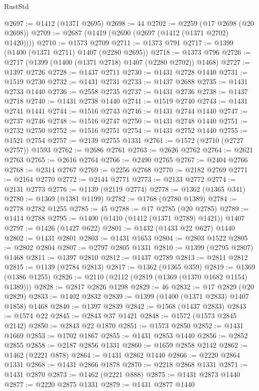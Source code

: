 \begin{lexlean}{RustStd}
\begin{coremodule}
@2697 := @1412 (@1371 @2695)
@2698 := 44
@2702 := @2259 (@17 @2698 (@20 @2698))
@2709 := @2687 (@1419 (@2690 (@2697 (@1412 (@1371 @2702) @1420))))
@2710 := @1573 @2709
@2711 := @1373 @791
@2717 := @1399 (@1400 (@1371 @2711) @1407 (@2280 @2695))
@2718 := @1373 @796
@2726 := @2717 (@1399 (@1400 (@1371 @2718) @1407 (@2280 @2702)) @1468)
@2727 := @1397 @2726
@2728 := @1437 @2711
@2730 := @1431 @2728 @1440
@2731 := @1519 @2730
@2732 := @1431 @2731
@2733 := @1437 @2688
@2735 := @1431 @2733 @1440
@2736 := @2558 @2735
@2737 := @1431 @2736
@2738 := @1437 @2718
@2740 := @1431 @2738 @1440
@2741 := @1519 @2740
@2743 := @1431 @2741 @1441
@2744 := @1516 @2743
@2746 := @1431 @2744 @1440
@2747 := @2737 @2746
@2748 := @1516 @2747
@2750 := @1431 @2748 @1440
@2751 := @2732 @2750
@2752 := @1516 @2751
@2754 := @1431 @2752 @1440
@2755 := @1521 @2754
@2757 := @2139 @2755 @1331
@2761 := @1572 (@2710 (@2727 @2757)) @1593
@2762 := @2686 @2761
@2763 := @2626 @2762
@2764 := @2621 @2763
@2765 := @2616 @2764
@2766 := @2490 @2765
@2767 := @2404 @2766
@2768 := @2314 @2767
@2769 := @2256 @2768
@2770 := @2182 @2769
@2771 := @2164 @2770
@2772 := @2144 @2771
@2773 := @2133 @2772
@2774 := @2131 @2773
@2776 := @1139 (@2119 @2774)
@2778 := @1362 (@1365 @341)
@2780 := @1369 (@1381 @1199)
@2782 := @1768 (@2780 @1389)
@2784 := @2778 @2782 @1255
@2785 := 45
@2788 := @17 @2785 (@20 @2785)
@2789 := @1414 @2788
@2795 := @1400 (@1410 (@1412 (@1371 @2789) @1421)) @1407
@2797 := @1426 (@1427 @622)
@2801 := @1432 (@1433 @22 @627) @1440
@2802 := @1431 @2801
@2803 := @1431 @1653
@2804 := @2803 @1522
@2805 := @2802 @2804
@2807 := @2797 @2805 @1331
@2810 := @1399 (@2795 @2807) @1468
@2811 := @1397 @2810
@2812 := @1437 @2789
@2813 := @2811 @2812
@2815 := @1139 (@2784 @2813)
@2817 := @1362 (@1365 @359)
@2819 := @1369 (@1386 @1255)
@2826 := @2110 (@2112 (@2819 (@1369 (@1370 @1682 @1154) @1389)))
@2828 := @2817 @2826 @1298
@2829 := 46
@2832 := @17 @2829 (@20 @2829)
@2833 := @1402 @2832
@2839 := @1399 (@1400 (@1371 @2833) @1407 @1858) @1468
@2840 := @1397 @2839
@2842 := @1568 (@1437 @2833)
@2843 := @1574 @22
@2845 := @2843 @37 @1421
@2848 := @1572 (@1573 @2845 @2142)
@2850 := @2843 @22 @1870
@2851 := @1573 @2850
@2852 := @1431 @1669
@2853 := @1702 @1867
@2855 := @1431 @2853 @1440
@2856 := @2852 @2855
@2858 := @2187 @2856 @1331
@2860 := @1659 @2858 @2142
@2862 := @1462 (@2221 @878)
@2864 := @1431 @2862 @1440
@2866 := @2220 @2864 @1331
@2868 := @1431 @2866 @1878
@2870 := @2218 @2868 @1331
@2871 := @1431 @2870
@2873 := @1462 (@2221 @888)
@2875 := @1431 @2873 @1440
@2877 := @2220 @2875 @1331
@2879 := @1431 @2877 @1440

\end{coremodule}
\end{lexlean}
